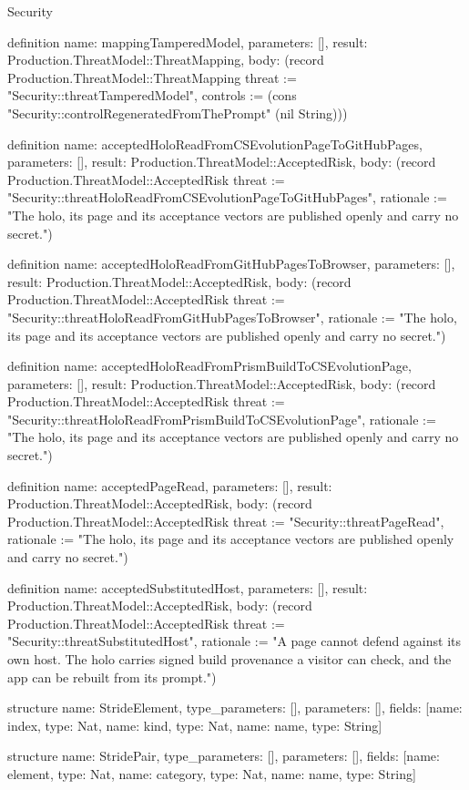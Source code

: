 \begin{lexlean}{Security}
\begin{semanticmodule}
definition{
  name: mappingTamperedModel,
  parameters: [],
  result: Production.ThreatModel::ThreatMapping,
  body: (record Production.ThreatModel::ThreatMapping {threat := "Security::threatTamperedModel", controls := (cons "Security::controlRegeneratedFromThePrompt" (nil String))})
}

definition{
  name: acceptedHoloReadFromCSEvolutionPageToGitHubPages,
  parameters: [],
  result: Production.ThreatModel::AcceptedRisk,
  body: (record Production.ThreatModel::AcceptedRisk {threat := "Security::threatHoloReadFromCSEvolutionPageToGitHubPages", rationale := "The holo, its page and its acceptance vectors are published openly and carry no secret."})
}

definition{
  name: acceptedHoloReadFromGitHubPagesToBrowser,
  parameters: [],
  result: Production.ThreatModel::AcceptedRisk,
  body: (record Production.ThreatModel::AcceptedRisk {threat := "Security::threatHoloReadFromGitHubPagesToBrowser", rationale := "The holo, its page and its acceptance vectors are published openly and carry no secret."})
}

definition{
  name: acceptedHoloReadFromPrismBuildToCSEvolutionPage,
  parameters: [],
  result: Production.ThreatModel::AcceptedRisk,
  body: (record Production.ThreatModel::AcceptedRisk {threat := "Security::threatHoloReadFromPrismBuildToCSEvolutionPage", rationale := "The holo, its page and its acceptance vectors are published openly and carry no secret."})
}

definition{
  name: acceptedPageRead,
  parameters: [],
  result: Production.ThreatModel::AcceptedRisk,
  body: (record Production.ThreatModel::AcceptedRisk {threat := "Security::threatPageRead", rationale := "The holo, its page and its acceptance vectors are published openly and carry no secret."})
}

definition{
  name: acceptedSubstitutedHost,
  parameters: [],
  result: Production.ThreatModel::AcceptedRisk,
  body: (record Production.ThreatModel::AcceptedRisk {threat := "Security::threatSubstitutedHost", rationale := "A page cannot defend against its own host. The holo carries signed build provenance a visitor can check, and the app can be rebuilt from its prompt."})
}

structure{
  name: StrideElement,
  type_parameters: [],
  parameters: [],
  fields: [{name: index, type: Nat}, {name: kind, type: Nat}, {name: name, type: String}]
}

structure{
  name: StridePair,
  type_parameters: [],
  parameters: [],
  fields: [{name: element, type: Nat}, {name: category, type: Nat}, {name: name, type: String}]
}


\end{semanticmodule}
\end{lexlean}
